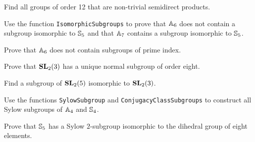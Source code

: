 \begin{prob}
    Find all groups of order 12 that are 
    non-trivial semidirect products.
\end{prob}


\begin{prob}
	\label{prob:subgroupsA6A7}
	Use the function \lstinline{IsomorphicSubgroups} to prove that
	$\mathbb{A}_{6}$ does not contain a subgroup isomorphic to $\mathbb{S}_5$ and that
	$\mathbb{A}_{7}$ contains a subgroup isomorphic to $\mathbb{S}_5$.
\end{prob}

\begin{prob}
Prove that $\mathbb{A}_6$ does not contain subgroups of prime index. 
\end{prob}

\begin{prob}
	\label{prob:normal_SL2(3)}
	Prove that $\mathbf{SL}_2(3)$ has a unique normal subgroup of order eight. 
\end{prob}


\begin{prob}
	\label{prob:SL2(5)}
	Find a subgroup of $\mathbf{SL}_2(5)$ isomorphic to $\mathbf{SL}_2(3)$.
\end{prob}

\begin{prob}
  Use the functions \lstinline{SylowSubgroup} and 
  \lstinline{ConjugacyClassSubgroups} to construct all Sylow subgroups 
  of $\mathbb{A}_4$ and $\mathbb{S}_4$.
\end{prob}

\begin{prob}
  Prove that $\mathbb{S}_5$ has a Sylow $2$-subgroup isomorphic to the dihedral group
  of eight elements. 
\end{prob}

